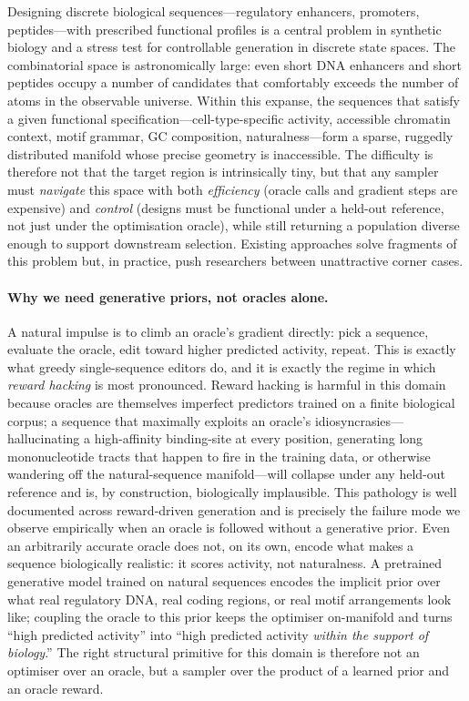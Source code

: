 \documentclass{article}
\theoremstyle{definition}
\theoremstyle{remark}
\begin{document}
Designing discrete biological sequences---regulatory enhancers, promoters, peptides---with prescribed functional profiles is a central problem in synthetic biology and a stress test for controllable generation in discrete state spaces. The combinatorial space is astronomically large: even short DNA enhancers and short peptides occupy a number of candidates that comfortably exceeds the number of atoms in the observable universe. Within this expanse, the sequences that satisfy a given functional specification---cell-type-specific activity, accessible chromatin context, motif grammar, GC composition, naturalness---form a sparse, ruggedly distributed manifold whose precise geometry is inaccessible. The difficulty is therefore not that the target region is intrinsically tiny, but that any sampler must \emph{navigate} this space with both \emph{efficiency} (oracle calls and gradient steps are expensive) and \emph{control} (designs must be functional under a held-out reference, not just under the optimisation oracle), while still returning a population diverse enough to support downstream selection. Existing approaches solve fragments of this problem but, in practice, push researchers between unattractive corner cases.

\paragraph{Why we need generative priors, not oracles alone.}
A natural impulse is to climb an oracle's gradient directly: pick a sequence, evaluate the oracle, edit toward higher predicted activity, repeat. This is exactly what greedy single-sequence editors do, and it is exactly the regime in which \emph{reward hacking} is most pronounced. Reward hacking is harmful in this domain because oracles are themselves imperfect predictors trained on a finite biological corpus; a sequence that maximally exploits an oracle's idiosyncrasies---hallucinating a high-affinity binding-site at every position, generating long mononucleotide tracts that happen to fire in the training data, or otherwise wandering off the natural-sequence manifold---will collapse under any held-out reference and is, by construction, biologically implausible. This pathology is well documented across reward-driven generation \citep{skalse2022defining,clark2024draft,gao2023scalinglawsoverop} and is precisely the failure mode we observe empirically when an oracle is followed without a generative prior. Even an arbitrarily accurate oracle does not, on its own, encode what makes a sequence biologically realistic: it scores activity, not naturalness. A pretrained generative model trained on natural sequences encodes the implicit prior over what real regulatory DNA, real coding regions, or real motif arrangements look like; coupling the oracle to this prior keeps the optimiser on-manifold and turns ``high predicted activity'' into ``high predicted activity \emph{within the support of biology}.'' The right structural primitive for this domain is therefore not an optimiser over an oracle, but a sampler over the product of a learned prior and an oracle reward.
\end{document}
